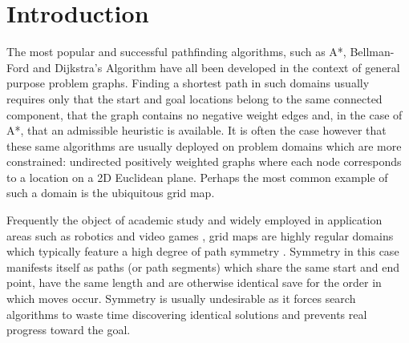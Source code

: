 \section{Introduction}

The most popular and successful pathfinding algorithms, such as A*, Bellman-Ford
and Dijkstra's Algorithm have all been developed in the context of general
purpose problem graphs.  Finding a shortest path in such domains usually
requires only that the start and goal locations belong to the same connected
component, that the graph contains no negative weight edges and, in the case of
A*, that an admissible heuristic is available.  It is often the case however
that these same algorithms are usually deployed on problem domains which are
more constrained: undirected positively weighted graphs where each node
corresponds to a location on a 2D Euclidean plane.
Perhaps the most common example of such a domain is the ubiquitous grid map.

Frequently the object of academic study \cite{yap02,botea04,bjornsson06} and
widely employed in application areas such as robotics \cite{choset05} and video
games \cite{sturtevant07}, grid maps are highly regular domains which
typically feature a high degree of path symmetry \cite{harabor10,pochter10}.
Symmetry in this case manifests itself as paths (or path segments) which share
the same start and end point, have the same length and are otherwise identical
save for the order in which moves occur.
Symmetry is usually undesirable as it forces search algorithms
to waste time discovering identical solutions and prevents real progress toward
the goal.

